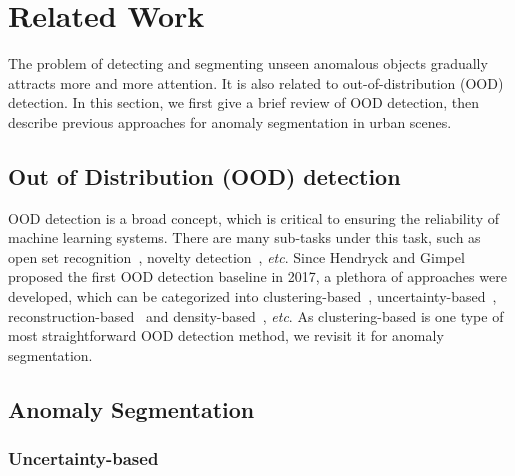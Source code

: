 \documentclass[10pt,twocolumn,letterpaper]{article}
\begin{document}
\section{Related Work}
The problem of detecting and segmenting unseen anomalous objects gradually attracts more and more attention. It is also related to out-of-distribution (OOD) detection. In this section, we first give a brief review of OOD detection, then describe previous approaches for anomaly segmentation in urban scenes.
\subsection{Out of Distribution (OOD) detection}

OOD detection is a broad concept, which is critical to ensuring the reliability of machine learning systems. There are many sub-tasks under this task, such as open set recognition~\cite{openset}, novelty detection~\cite{nd1,nd2}, \emph{etc}.  Since Hendryck and Gimpel~\cite{MSP} proposed the first OOD detection baseline in 2017, a plethora of approaches were developed, which can be categorized into clustering-based~\cite{clus,clus2}, uncertainty-based~\cite{streethazards,SML,odin,deepmetric}, reconstruction-based~\cite{memAE,imgr,SynthCP,synboost} and density-based~\cite{density1,density2}, \emph{etc}. As clustering-based is one type of most straightforward OOD detection method, we revisit it for anomaly segmentation.


\subsection{Anomaly Segmentation}

\subsubsection{Uncertainty-based}
\end{document}
